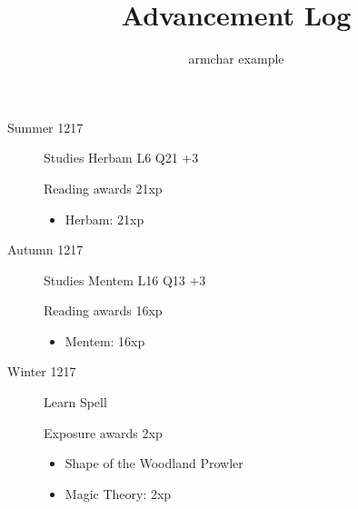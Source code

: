 \documentclass{scrartcl}
\title{Advancement Log}
\author{armchar example}
\begin{document}
\maketitle
\begin{description}
  \item[Summer 1217]
    Studies Herbam L6 Q21 +3

    Reading awards 21xp
    \begin{itemize}
      \item Herbam: 21xp
    \end{itemize}
  \item[Autumn 1217]
    Studies Mentem L16 Q13 +3

    Reading awards 16xp
    \begin{itemize}
      \item Mentem: 16xp
    \end{itemize}
  \item[Winter 1217]
    Learn Spell

    Exposure awards 2xp
    \begin{itemize}
      \item Shape of the Woodland Prowler
      \item Magic Theory: 2xp
    \end{itemize}
\end{description}
\end{document}
